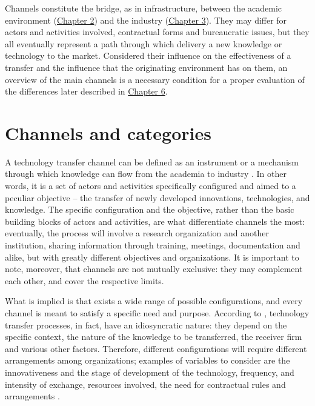 

\label{Chapter4} %

Channels constitute the bridge, as in infrastructure, between the academic environment (\hyperref[Chapter2]{Chapter 2}) and the industry (\hyperref[Chapter3]{Chapter 3}). They may differ for actors and activities involved, contractual forms and bureaucratic issues, but they all eventually represent a path through which delivery a new knowledge or technology to the market. Considered their influence on the effectiveness of a transfer and the influence that the originating environment has on them, an overview of the main channels is a necessary condition for a proper evaluation of the differences later described in \hyperref[Chapter6]{Chapter 6}.  

\section{Channels and categories}

A technology transfer channel can be defined as an instrument or a mechanism through which knowledge can flow from the academia to industry \citep{Gilsing2011}. In other words, it is a set of actors and activities specifically configured and aimed to a peculiar objective – the transfer of newly developed innovations, technologies, and knowledge. The specific configuration and the objective, rather than the basic building blocks of actors and activities, are what differentiate channels the most: eventually, the process will involve a research organization and another institution, sharing information through training, meetings, documentation and alike, but with greatly different objectives and organizations. It is important to note, moreover, that channels are not mutually exclusive: they may complement each other, and cover the respective limits.

What is implied is that exists a wide range of possible configurations, and every channel is meant to satisfy a specific need and purpose. According to \citet{DEste2007}, technology transfer processes, in fact, have an idiosyncratic nature: they depend on the specific context, the nature of the knowledge to be transferred, the receiver firm and various other factors. Therefore, different configurations will require different arrangements among organizations; examples of variables to consider are the innovativeness and the stage of development of the technology, frequency, and intensity of exchange, resources involved, the need for contractual rules and arrangements \citep{DEste2007}.

